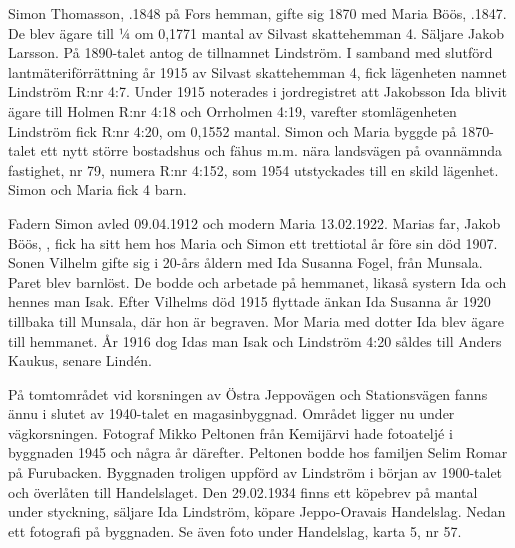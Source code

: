 Simon Thomasson, .1848 på Fors hemman, gifte sig 1870 med	Maria Böös, .1847. De blev ägare till ¼ om 0,1771 mantal av Silvast skattehemman 4. Säljare Jakob Larsson. På 1890-talet antog de tillnamnet Lindström. I samband med slutförd lantmäteriförrättning år 1915 av Silvast skattehemman 4, fick lägenheten namnet Lindström R:nr 4:7. Under 1915 noterades i jordregistret att Jakobsson Ida blivit ägare till Holmen R:nr 4:18 och Orrholmen 4:19, varefter stomlägenheten Lindström fick R:nr 4:20, om 0,1552 mantal. Simon och Maria byggde på 1870-talet ett nytt större bostadshus och fähus m.m. nära landsvägen på ovannämnda fastighet, nr 79, numera R:nr 4:152, som 1954 utstyckades till en skild lägenhet. Simon och Maria fick 4 barn.
\begin{jhchildren}
  \item {}
  \item {}
  \item {}
  \item {}
\end{jhchildren}
Fadern Simon avled 09.04.1912 och modern Maria 13.02.1922. Marias far, Jakob Böös, , fick ha sitt hem hos Maria och Simon ett trettiotal år före sin död 1907. Sonen Vilhelm gifte sig i 20-års åldern med Ida Susanna Fogel, från Munsala. Paret blev barnlöst. De bodde och arbetade på hemmanet, likaså systern Ida och hennes man Isak. Efter Vilhelms död 1915 flyttade änkan Ida Susanna år 1920 tillbaka till Munsala, där hon är begraven. Mor Maria med dotter Ida blev ägare till hemmanet. År 1916 dog Idas man Isak och Lindström 4:20 såldes till Anders Kaukus, senare Lindén.



På tomtområdet vid korsningen av Östra Jeppovägen och Stationsvägen fanns ännu i slutet av 1940-talet en magasinbyggnad. Området ligger nu under vägkorsningen. Fotograf Mikko Peltonen från Kemijärvi hade fotoateljé i byggnaden 1945 och några år därefter. Peltonen bodde hos familjen Selim Romar på Furubacken. Byggnaden troligen uppförd av Lindström i början av 1900-talet och överlåten till Handelslaget. Den 29.02.1934 finns ett köpebrev på mantal under styckning, säljare Ida Lindström, köpare Jeppo-Oravais Handelslag. Nedan ett fotografi på byggnaden. Se även foto under Handelslag, karta 5, nr 57.

